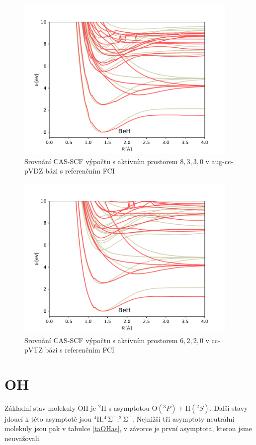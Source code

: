 \begin{figure}
\centering
\includegraphics[width=0.95\textwidth]{../img/BeH-MULTI-DZ-8330.pdf}
\caption{Srovnání CAS-SCF výpočtu s aktivním prostorem $8,3,3,0$ v aug-cc-pVDZ bázi s referenčním FCI}
\label{gr_Beh_8330}
\end{figure}

\begin{figure}
\centering
\includegraphics[width=0.95\textwidth]{../img/BeH-MULTI-TZ-6220.pdf}
\caption{Srovnání CAS-SCF výpočtu s aktivním prostorem $6,2,2,0$ v cc-pVTZ bázi s referenčním FCI}
\label{gr_Beh_TZ}
\end{figure}


\section{OH}
Základní stav molekuly OH je $\mathrm{^2\Pi}$ s asymptotou 
$\mathrm{O}(^3P) + \mathrm{H}(^2S)$. Další 
stavy jdoucí k této asymptotě jsou $\mathrm{^4\Pi, ^4\Sigma^-, ^2\Sigma^- }$.
Nejnižší tři asymptoty neutrální molekuly jsou pak v tabulce \ref{taOHas}, v závorce je
první asymptota, kterou jsme neuvažovali.

